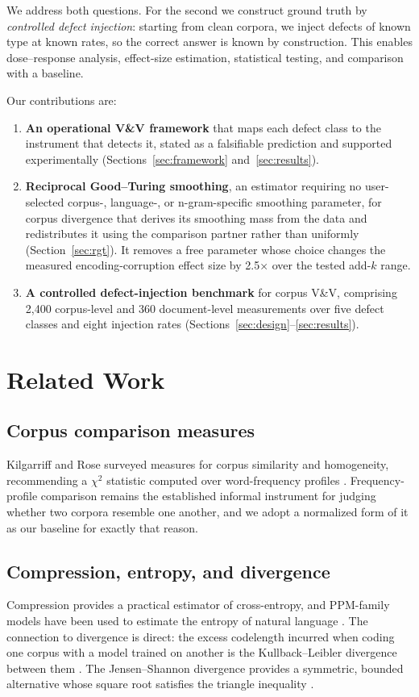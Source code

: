 \documentclass[conference]{IEEEtran}
\begin{document}
We address both questions. For the second we construct ground truth by
\emph{controlled defect injection}: starting from clean corpora, we inject
defects of known type at known rates, so the correct answer is known by
construction. This enables dose–response analysis, effect-size estimation, statistical testing, and comparison with a baseline.

Our contributions are:

\begin{enumerate}
  \item \textbf{An operational V\&V framework} that maps each defect class to the
        instrument that detects it, stated as a falsifiable prediction and
        supported experimentally (Sections~\ref{sec:framework}
        and~\ref{sec:results}).
  \item \textbf{Reciprocal Good--Turing smoothing}, an estimator requiring no user-selected 
        corpus-, language-, or n-gram-specific smoothing parameter, 
        for corpus divergence that derives its smoothing mass from the data and
        redistributes it using the comparison partner rather than uniformly
        (Section~\ref{sec:rgt}). It removes a free parameter whose choice changes the measured encoding-corruption effect size by 2.5× over the tested add-$k$ range.
  \item \textbf{A controlled defect-injection benchmark} for corpus V\&V,
        comprising 2{,}400 corpus-level and 360 document-level measurements over
        five defect classes and eight injection rates
        (Sections~\ref{sec:design}--\ref{sec:results}).
\end{enumerate}

\section{Related Work}

\subsection{Corpus comparison measures}
Kilgarriff and Rose surveyed measures for corpus similarity and homogeneity,
recommending a $\chi^2$ statistic computed over word-frequency profiles
\cite{kilgarriff1998,kilgarriff2001}. Frequency-profile comparison remains the
established informal instrument for judging whether two corpora resemble one
another, and we adopt a normalized form of it as our baseline for exactly that
reason.

\subsection{Compression, entropy, and divergence}
Compression provides a practical estimator of cross-entropy, and PPM-family
models have been used to estimate the entropy of natural language
\cite{cleary1984,teahan1996}. The connection to divergence is direct: the excess
codelength incurred when coding one corpus with a model trained on another is the
Kullback--Leibler divergence between them \cite{cover2006}. The Jensen--Shannon
divergence \cite{lin1991} provides a symmetric, bounded alternative whose square
root satisfies the triangle inequality \cite{endres2003}.
\end{document}
